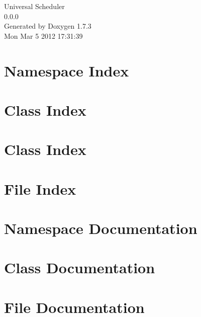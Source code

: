 \documentclass[a4paper]{book}
\begin{document}
\hypersetup{pageanchor=false}
\begin{titlepage}
\vspace*{7cm}
\begin{center}
{\Large Universal Scheduler \\[1ex]\large 0.0.0 }\\
\vspace*{1cm}
{\large Generated by Doxygen 1.7.3}\\
\vspace*{0.5cm}
{\small Mon Mar 5 2012 17:31:39}\\
\end{center}
\end{titlepage}
\clearemptydoublepage
{}
\tableofcontents
\clearemptydoublepage
{}
\hypersetup{pageanchor=true}
\chapter{Namespace Index}

\chapter{Class Index}

\chapter{Class Index}

\chapter{File Index}

\chapter{Namespace Documentation}

\chapter{Class Documentation}















\chapter{File Documentation}





















\printindex
\end{document}
